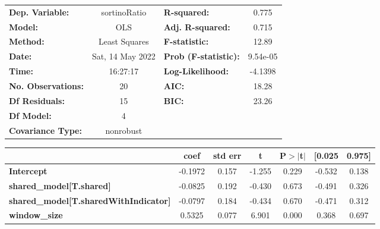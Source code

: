 \begin{center}
\begin{tabular}{lclc}
\toprule
\textbf{Dep. Variable:}                       &   sortinoRatio   & \textbf{  R-squared:         } &     0.775   \\
\textbf{Model:}                               &       OLS        & \textbf{  Adj. R-squared:    } &     0.715   \\
\textbf{Method:}                              &  Least Squares   & \textbf{  F-statistic:       } &     12.89   \\
\textbf{Date:}                                & Sat, 14 May 2022 & \textbf{  Prob (F-statistic):} &  9.54e-05   \\
\textbf{Time:}                                &     16:27:17     & \textbf{  Log-Likelihood:    } &   -4.1398   \\
\textbf{No. Observations:}                    &          20      & \textbf{  AIC:               } &     18.28   \\
\textbf{Df Residuals:}                        &          15      & \textbf{  BIC:               } &     23.26   \\
\textbf{Df Model:}                            &           4      & \textbf{                     } &             \\
\textbf{Covariance Type:}                     &    nonrobust     & \textbf{                     } &             \\
\bottomrule
\end{tabular}
\begin{tabular}{lcccccc}
                                              & \textbf{coef} & \textbf{std err} & \textbf{t} & \textbf{P$> |$t$|$} & \textbf{[0.025} & \textbf{0.975]}  \\
\midrule
\textbf{Intercept}                            &      -0.1972  &        0.157     &    -1.255  &         0.229        &       -0.532    &        0.138     \\
\textbf{shared\_model[T.shared]}              &      -0.0825  &        0.192     &    -0.430  &         0.673        &       -0.491    &        0.326     \\
\textbf{shared\_model[T.sharedWithIndicator]} &      -0.0797  &        0.184     &    -0.434  &         0.670        &       -0.471    &        0.312     \\
\textbf{window\_size}                         &       0.5325  &        0.077     &     6.901  &         0.000        &        0.368    &        0.697     \\

\end{tabular}
\end{center}
